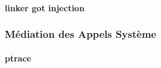 
\paragraph{linker got injection}

\subsubsection{Médiation des Appels Système}

\paragraph{ptrace}

